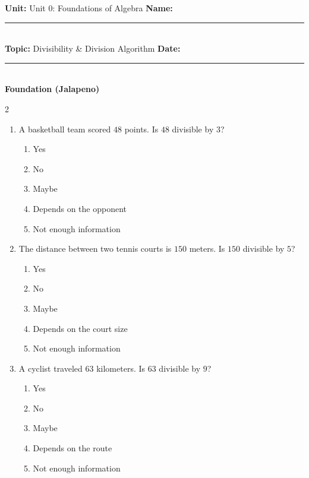 \documentclass[10pt]{article}
\begin{document}
\enlargethispage{2.5cm}

\begin{tcolorbox}[colback=mainblue!5, colframe=mainblue, sharp corners, boxrule=0.5pt]
    \small \textbf{Unit:} Unit 0: Foundations of Algebra \hfill \textbf{Name:} \rule{3cm}{0.4pt} \\
    \small \textbf{Topic:} Divisibility & Division Algorithm \hfill \textbf{Date:} \rule{2cm}{0.4pt} \\
    \centering \textbf{\large Foundation (Jalapeno)}
\end{tcolorbox}

\vspace{0.2cm}

\begin{multicols}{2}
\begin{enumerate}[label=\textbf{Q\arabic*.}, leftmargin=*, itemsep=6pt, parsep=0pt]

  \item \small A basketball team scored $48$ points. Is $48$ divisible by $3$?
  \begin{enumerate}[label=(\Alph*), leftmargin=0.6cm, nosep, itemsep=2pt]
    \item Yes
    \item No
    \item Maybe
    \item Depends on the opponent
    \item Not enough information
  \end{enumerate}

  \item \small The distance between two tennis courts is $150$ meters. Is $150$ divisible by $5$?
  \begin{enumerate}[label=(\Alph*), leftmargin=0.6cm, nosep, itemsep=2pt]
    \item Yes
    \item No
    \item Maybe
    \item Depends on the court size
    \item Not enough information
  \end{enumerate}

  \item \small A cyclist traveled $63$ kilometers. Is $63$ divisible by $9$?
  \begin{enumerate}[label=(\Alph*), leftmargin=0.6cm, nosep, itemsep=2pt]
    \item Yes
    \item No
    \item Maybe
    \item Depends on the route
    \item Not enough information
  \end{enumerate}


\end{enumerate}
\end{multicols}
\end{document}

